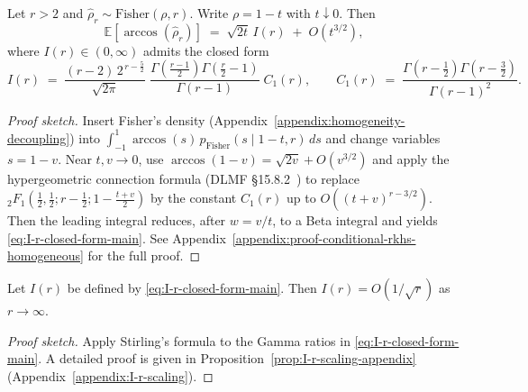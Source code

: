 \begin{proposition}[Puiseux expansion of \(\mathbb{E}(\arccos(\hat{\rho}_r))\) near \(\rho=1\)]\label{prop:puiseux-arccos-fisher}
Let \(r>2\) and \(\hat{\rho}_r\sim \mathrm{Fisher}(\rho,r)\). Write \(\rho=1-t\) with \(t\downarrow 0\). Then
\[
\mathbb{E}[\arccos(\hat{\rho}_r)]
\;=\;
\sqrt{2t}\,I(r) \;+\; O(t^{3/2}),
\]
where \(I(r)\in(0,\infty)\) admits the closed form
\begin{equation}\label{eq:I-r-closed-form-main}
I(r) \;=\; \frac{(r-2)\,2^{\,r-\frac{5}{2}}}{\sqrt{2\pi}}\;
\frac{\Gamma\!\left(\frac{r-1}{2}\right)\Gamma\!\left(\frac{r}{2}-1\right)}{\Gamma(r-1)}\;
C_1(r),\qquad
C_1(r) \;=\; \frac{\Gamma\!\left(r-\tfrac{1}{2}\right)\Gamma\!\left(r-\tfrac{3}{2}\right)}{\Gamma(r-1)^2}.
\end{equation}
\end{proposition}
\begin{proof}[Proof sketch]
Insert Fisher's density (Appendix~\ref{appendix:homogeneity-decoupling}) into \(\int_{-1}^1 \arccos(s)\,p_{\mathrm{Fisher}}(s\mid 1-t,r)\,ds\) and change variables \(s=1-v\).
Near \(t,v\to 0\), use \(\arccos(1-v)=\sqrt{2v}+O(v^{3/2})\) and apply the hypergeometric connection formula (DLMF §15.8.2~\cite{nist_dlmf}) to replace \({}_2F_1(\tfrac12,\tfrac12;r-\tfrac12;1-\tfrac{t+v}{2})\) by the constant \(C_1(r)\) up to \(O((t+v)^{r-3/2})\).
Then the leading integral reduces, after \(w=v/t\), to a Beta integral and yields \eqref{eq:I-r-closed-form-main}. See Appendix~\ref{appendix:proof-conditional-rkhs-homogeneous} for the full proof.
\end{proof}

\begin{proposition}\label{prop:I-r-scaling-main}
Let \(I(r)\) be defined by \eqref{eq:I-r-closed-form-main}. Then \(I(r)=O(1/\sqrt{r})\) as \(r\to\infty\).
\end{proposition}
\begin{proof}[Proof sketch]
Apply Stirling's formula to the Gamma ratios in \eqref{eq:I-r-closed-form-main}. A detailed proof is given in Proposition~\ref{prop:I-r-scaling-appendix} (Appendix~\ref{appendix:I-r-scaling}).
\end{proof}

